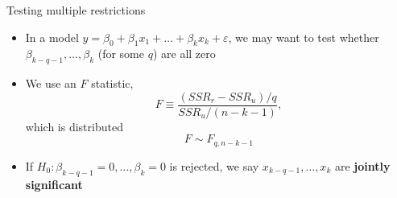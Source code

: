 \documentclass[
  ignorenonframetext,
]{beamer}
\providecommand{\tightlist}{%
  \setlength{\itemsep}{0pt}\setlength{\parskip}{0pt}}
\newcommand{\setsep}{\setlength{\itemsep}{3pt}}
\newcommand{\setskip}{\setlength{\parskip}{3pt}}
\renewcommand{\tightlist}{\setsep\setskip}
\begin{document}
\begin{frame}{Testing multiple restrictions}
\protect\hypertarget{testing-multiple-restrictions}{}
\pause

\begin{itemize}[<+->]
\tightlist
\item
  In a model \(y = \beta_0 + \beta_1 x_1 + \dots + \beta_k x_k + \varepsilon\), we may want to test whether \(\beta_{k - q - 1}, \dots, \beta_k\) (for some \(q\)) are all zero
\item
  We use an \(F\) statistic, \[ F \equiv \frac{\left(SSR_r - SSR_u\right)/q}{SSR_u/(n-k-1)}, \] which is distributed \[ F \sim F_{q,n-k-1} \]
\item
  If \(H_0: \beta_{k - q - 1} = 0, \dots, \beta_k = 0\) is rejected, we say \(x_{k - q - 1}, \dots, x_k\) are \textbf{jointly significant}
\end{itemize}
\end{frame}
\end{document}
